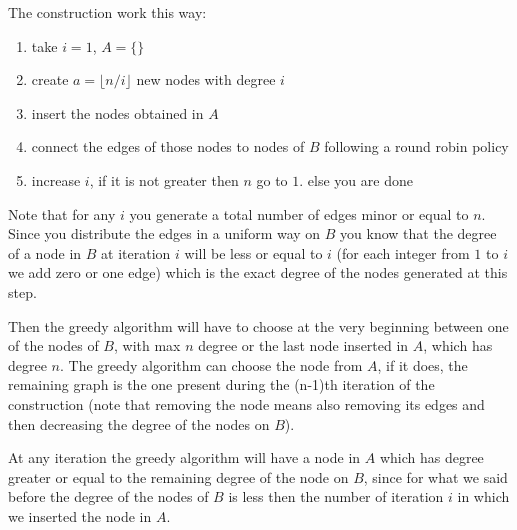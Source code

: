 \documentclass[a4paper]{article}
\begin{document}
The construction work this way:
\begin{enumerate}
\item take $i = 1$, $A = \{\}$
\item create $a = \lfloor n/i \rfloor$ new nodes with degree $i$
\item insert the nodes obtained in $A$
\item connect the edges of those nodes to nodes of $B$ following a round robin policy
\item increase $i$, if it is not greater then $n$ go to $1.$ else you are done
\end{enumerate}

Note that for any $i$ you generate a total number of edges minor or equal to $n$.
Since you distribute the edges in a uniform way on $B$ you know that the degree of a node in $B$ at iteration $i$ will be less or equal to $i$ (for each integer from $1$ to $i$ we add zero or one edge) which is the exact degree of the nodes generated at this step.

Then the greedy algorithm will have to choose at the very beginning between one of the nodes of $B$, with max $n$ degree or the last node inserted in $A$, which has degree $n$.
The greedy algorithm can choose the node from $A$, if it does, the remaining graph is the one present during the (n-1)th iteration of the construction (note that removing the node means also removing its edges and then decreasing the degree of the nodes on $B$).

At any iteration the greedy algorithm will have a node in $A$ which has degree greater or equal to the remaining degree of the node on $B$, since for what we said before the degree of the nodes of $B$ is less then the number of iteration $i$ in which we inserted the node in $A$. %
\end{document}
